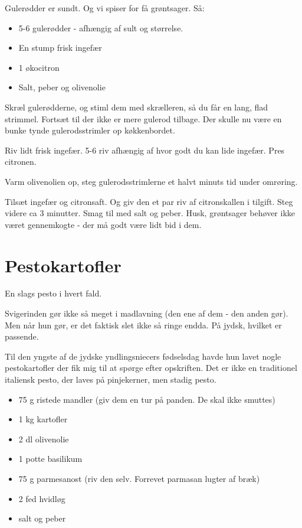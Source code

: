 \documentclass[
]{book}
\providecommand{\tightlist}{%
  \setlength{\itemsep}{0pt}\setlength{\parskip}{0pt}}
\begin{document}
Gulerødder er sundt. Og vi spiser for få grøntsager. Så:

\begin{itemize}
\tightlist
\item
  5-6 gulerødder - afhængig af sult og størrelse.
\item
  En stump frisk ingefær
\item
  1 økocitron
\item
  Salt, peber og olivenolie
\end{itemize}

Skræl gulerødderne, og stiml dem med skrælleren, så du får en lang, flad strimmel. Fortsæt til der ikke er mere gulerod tilbage. Der skulle nu være en bunke tynde gulerodsstrimler op køkkenbordet.

Riv lidt frisk ingefær. 5-6 riv afhængig af hvor godt du kan lide ingefær. Pres citronen.

Varm olivenolien op, steg gulerodsstrimlerne et halvt minuts tid under omrøring.

Tilsæt ingefær og citronsaft. Og giv den et par riv af citronskallen i tilgift. Steg videre ca 3 minutter. Smag til med salt og peber. Husk, grøntsager behøver ikke været gennemkogte - der må godt være lidt bid i dem.

\section{Pestokartofler}\label{pestokartofler}

En slags pesto i hvert fald.

Svigerinden gør ikke så meget i madlavning (den ene af dem - den anden gør). Men når hun gør, er det faktisk slet ikke så ringe endda. På jydsk, hvilket er passende.

Til den yngste af de jydske yndlingsniecers fødselsdag havde hun lavet nogle pestokartofler der fik mig til at spørge efter opskriften. Det er ikke en traditionel italiensk pesto, der laves på pinjekerner, men stadig pesto.

\begin{itemize}
\tightlist
\item
  75 g ristede mandler (giv dem en tur på panden. De skal ikke smuttes)
\item
  1 kg kartofler
\item
  2 dl olivenolie
\item
  1 potte basilikum
\item
  75 g parmesanost (riv den selv. Forrevet parmasan lugter af bræk)
\item
  2 fed hvidløg
\item
  salt og peber
\end{itemize}
\end{document}
